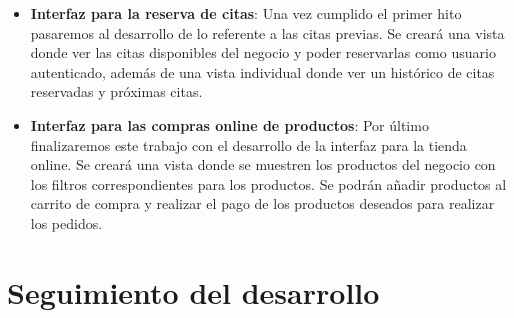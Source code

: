 \begin{itemize}
\begin{itemize}
                \item \textbf{Interfaz para la reserva de citas}: Una vez cumplido el primer hito pasaremos al
                desarrollo de lo referente a las citas previas. Se creará una vista donde ver las citas disponibles del
                negocio y poder reservarlas como usuario autenticado, además de una vista individual donde ver
                un histórico de citas reservadas y próximas citas.

                \item \textbf{Interfaz para las compras online de productos}: Por último finalizaremos este trabajo con
                el desarrollo de la interfaz para la tienda online. Se creará una vista donde se muestren los productos
                del negocio con los filtros correspondientes para los productos. Se podrán añadir productos al carrito
                de compra y realizar el pago de los productos deseados para realizar los pedidos.

            \end{itemize}
\end{itemize}
\section{Seguimiento del desarrollo}
